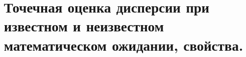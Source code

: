 \documentclass[polytech/stats/exam-2023/stats-exam-2023.tex]{subfiles}
\begin{document}
\section{Точечная оценка дисперсии при известном и неизвестном математическом ожидании, свойства.}
\end{document}
